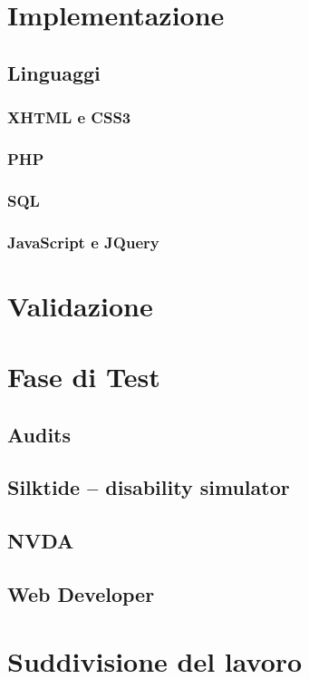 \documentclass[a4paper, oneside, openany, dvipsnames, table]{article}
\begin{document}
\section{Implementazione}
	
	\subsection{Linguaggi}
		
		\subsubsection{XHTML e CSS3}
			
		\subsubsection{PHP}
			
		\subsubsection{SQL}
			
		\subsubsection{JavaScript e JQuery}
			
\newpage
\section{Validazione}
	
\newpage
\section{Fase di Test}
	
	\subsection{Audits}
			
	\subsection{Silktide – disability simulator}
			
	\subsection{NVDA}
			
	\subsection{Web Developer}
				
\newpage
\section{Suddivisione del lavoro}
	
						
\end{document}
